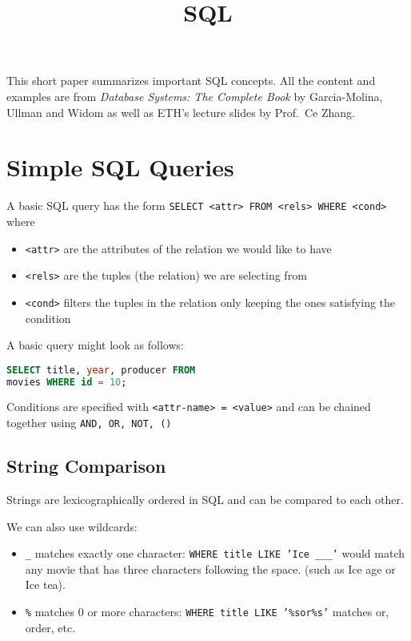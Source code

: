 \documentclass{sciposter}
\title{\huge{SQL}}
\author{\vspace{-1cm}}
\renewcommand{\t}[1]{\texttt{#1}}
\begin{document}
\maketitle

\begin{multicols}{3}

This short paper summarizes important SQL concepts. All the content and examples are from \textit{Database Systems: The Complete Book} by Garcia-Molina, Ullman and Widom as well as ETH's lecture slides by Prof.\ Ce Zhang.




\section*{Simple SQL Queries}

A basic SQL query has the form \t{SELECT <attr> FROM <rels> WHERE <cond>} where 
\begin{itemize}
	\item \t{<attr>} are the attributes of the relation we would like to have
	\item \t{<rels>} are the tuples (the relation) we are selecting from
	\item \t{<cond>} filters the tuples in the relation only keeping the ones satisfying the condition
\end{itemize}

A basic query might look as follows:

\begin{lstlisting}[language=SQL]
SELECT title, year, producer FROM
movies WHERE id = 10;
\end{lstlisting}

Conditions are specified with \t{<attr-name> = <value>} and can be chained together using \t{AND, OR, NOT, ()}

\subsection*{String Comparison}

Strings are lexicographically ordered in SQL and can be compared to each other.

We can also use wildcards:
\begin{itemize}
	\item \t{\_} matches exactly one character: \t{WHERE title LIKE 'Ice \_\_\_'} would match any movie that has three characters following the space. (such as Ice age or Ice tea).
	\item\t{\%} matches 0 or more characters: \t{WHERE title LIKE '\%sor\%s'} matches or, order, etc.
\end{itemize}



\end{multicols}
\end{document}
